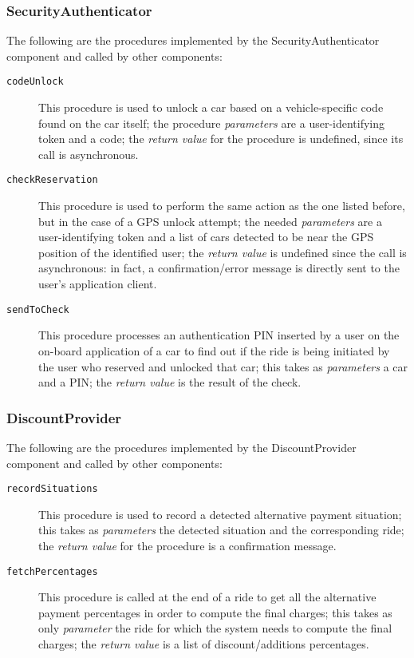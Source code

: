 \subsubsection{SecurityAuthenticator}
The following are the procedures implemented by the SecurityAuthenticator component and called by other components:
\begin{description}
\item[\texttt{codeUnlock}] This procedure is used to unlock a car based on a vehicle-specific code found on the car itself; the procedure \textit{parameters} are a user-identifying token and a code; the \textit{return value} for the procedure is undefined, since its call is asynchronous.
\item[\texttt{checkReservation}] This procedure is used to perform the same action as the one listed before, but in the case of a GPS unlock attempt; the needed \textit{parameters} are a user-identifying token and a list of cars detected to be near the GPS position of the identified user; the \textit{return value} is undefined since the call is asynchronous: in fact, a confirmation/error message is directly sent to the user's application client.
\item[\texttt{sendToCheck}] This procedure processes an authentication PIN inserted by a user on the on-board application of a car to find out if the ride is being initiated by the user who reserved and unlocked that car; this takes as \textit{parameters} a car and a PIN; the \textit{return value} is the result of the check.
\end{description}
\subsubsection{DiscountProvider}
The following are the procedures implemented by the DiscountProvider component and called by other components:
\begin{description}
\item[\texttt{recordSituations}] This procedure is used to record a detected alternative payment situation; this takes as \textit{parameters} the detected situation and the corresponding ride; the \textit{return value} for the procedure is a confirmation message.
\item[\texttt{fetchPercentages}] This procedure is called at the end of a ride to get all the alternative payment percentages in order to compute the final charges; this takes as only \textit{parameter} the ride for which the system needs to compute the final charges; the \textit{return value} is a list of discount/additions percentages.
\end{description}
